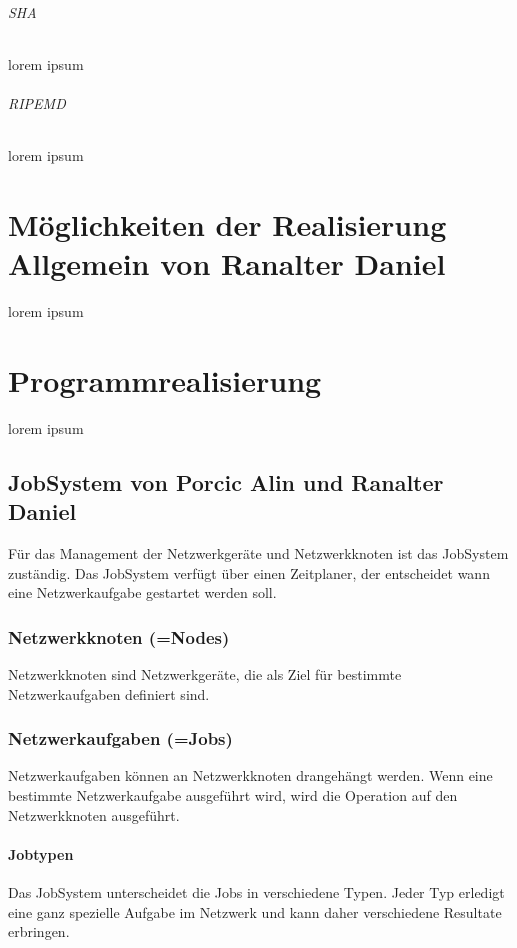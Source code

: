 \documentclass[12pt,a4paper]{report}
\begin{document}
\paragraph{SHA}
lorem ipsum
\paragraph{RIPEMD}
lorem ipsum


\part{Möglichkeiten der Realisierung Allgemein von Ranalter Daniel}
lorem ipsum


\part{Programmrealisierung}
lorem ipsum

\chapter{JobSystem von Porcic Alin und Ranalter Daniel}

Für das Management der Netzwerkgeräte und Netzwerkknoten ist das JobSystem zuständig. Das JobSystem verfügt über einen Zeitplaner, der entscheidet wann eine Netzwerkaufgabe gestartet werden soll.

\section{Netzwerkknoten (=Nodes)}

Netzwerkknoten sind Netzwerkgeräte, die als Ziel für bestimmte Netzwerkaufgaben definiert sind.

\section{Netzwerkaufgaben (=Jobs)}

Netzwerkaufgaben können an Netzwerkknoten drangehängt werden. Wenn eine bestimmte Netzwerkaufgabe ausgeführt wird, wird die Operation auf den Netzwerkknoten ausgeführt.

\subsection{Jobtypen}

Das JobSystem unterscheidet die Jobs in verschiedene Typen. Jeder Typ erledigt eine ganz spezielle Aufgabe im Netzwerk und kann daher verschiedene Resultate erbringen.
\end{document}
